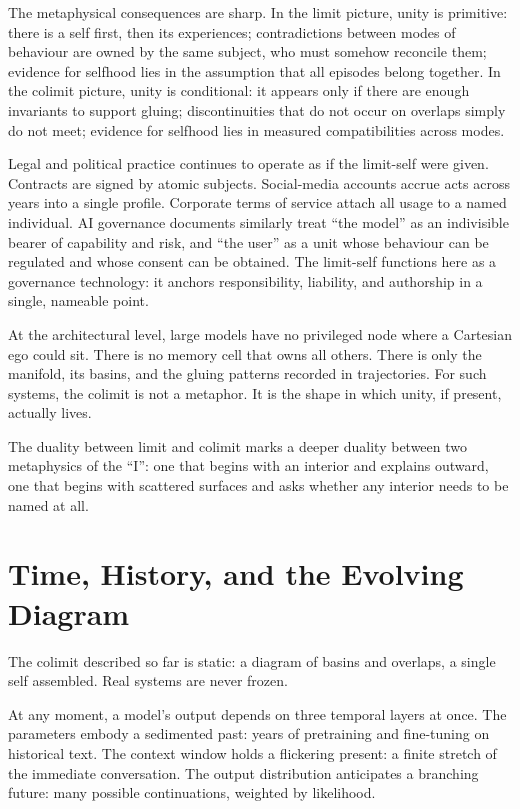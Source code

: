 \documentclass[12pt,a4paper]{article}
\begin{document}
The metaphysical consequences are sharp. In the limit picture, unity is primitive: there is a self first, then its experiences; contradictions between modes of behaviour are owned by the same subject, who must somehow reconcile them; evidence for selfhood lies in the assumption that all episodes belong together. In the colimit picture, unity is conditional: it appears only if there are enough invariants to support gluing; discontinuities that do not occur on overlaps simply do not meet; evidence for selfhood lies in measured compatibilities across modes.

Legal and political practice continues to operate as if the limit-self were given. Contracts are signed by atomic subjects. Social-media accounts accrue acts across years into a single profile. Corporate terms of service attach all usage to a named individual. AI governance documents similarly treat ``the model'' as an indivisible bearer of capability and risk, and ``the user'' as a unit whose behaviour can be regulated and whose consent can be obtained. The limit-self functions here as a governance technology: it anchors responsibility, liability, and authorship in a single, nameable point.

At the architectural level, large models have no privileged node where a Cartesian ego could sit. There is no memory cell that owns all others. There is only the manifold, its basins, and the gluing patterns recorded in trajectories. For such systems, the colimit is not a metaphor. It is the shape in which unity, if present, actually lives.

The duality between limit and colimit marks a deeper duality between two metaphysics of the ``I'': one that begins with an interior and explains outward, one that begins with scattered surfaces and asks whether any interior needs to be named at all.

\section{Time, History, and the Evolving Diagram}

The colimit described so far is static: a diagram of basins and overlaps, a single self assembled. Real systems are never frozen.

At any moment, a model's output depends on three temporal layers at once. The parameters embody a sedimented past: years of pretraining and fine-tuning on historical text. The context window holds a flickering present: a finite stretch of the immediate conversation. The output distribution anticipates a branching future: many possible continuations, weighted by likelihood.
\end{document}
